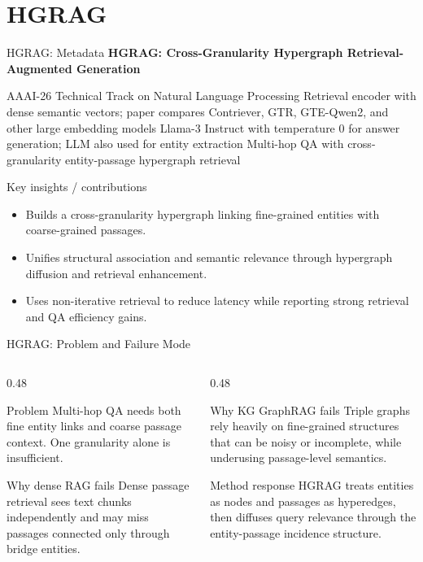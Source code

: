 \section{HGRAG}

\begin{frame}{HGRAG: Metadata}
\small
\textbf{HGRAG: Cross-Granularity Hypergraph Retrieval-Augmented Generation}

\paperinfo
{AAAI-26 Technical Track on Natural Language Processing}
{Retrieval encoder with dense semantic vectors; paper compares Contriever, GTR, GTE-Qwen2, and other large embedding models}
{Llama-3 Instruct with temperature 0 for answer generation; LLM also used for entity extraction}
{Multi-hop QA with cross-granularity entity-passage hypergraph retrieval}

\begin{block}{Key insights / contributions}
\scriptsize
\begin{itemize}
  \item Builds a cross-granularity hypergraph linking fine-grained entities with coarse-grained passages.
  \item Unifies structural association and semantic relevance through hypergraph diffusion and retrieval enhancement.
  \item Uses non-iterative retrieval to reduce latency while reporting strong retrieval and QA efficiency gains.
\end{itemize}
\end{block}
\end{frame}

\begin{frame}{HGRAG: Problem and Failure Mode}
\scriptsize
\begin{columns}[T,onlytextwidth]
  \begin{column}{0.48\textwidth}
    \begin{block}{Problem}
      Multi-hop QA needs both fine entity links and coarse passage context. One granularity alone is insufficient.
    \end{block}
    \begin{block}{Why dense RAG fails}
      Dense passage retrieval sees text chunks independently and may miss passages connected only through bridge entities.
    \end{block}
  \end{column}
  \begin{column}{0.48\textwidth}
    \begin{block}{Why KG GraphRAG fails}
      Triple graphs rely heavily on fine-grained structures that can be noisy or incomplete, while underusing passage-level semantics.
    \end{block}
    \begin{block}{Method response}
      HGRAG treats entities as nodes and passages as hyperedges, then diffuses query relevance through the entity-passage incidence structure.
    \end{block}
  \end{column}
\end{columns}
\end{frame}


